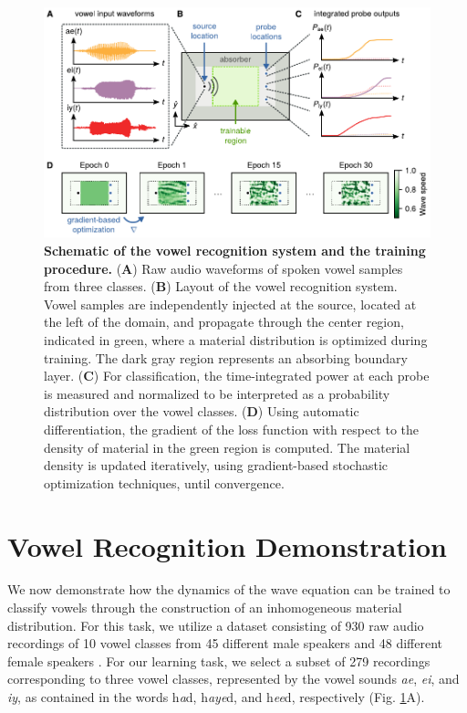 \begin{figure}
  \centering
  \includegraphics{figures/insitu_RNN_train}
  \caption{
  \textbf{Schematic of the vowel recognition system and the training procedure.}
  (\textbf{A})
  Raw audio waveforms of spoken vowel samples from three classes.
  (\textbf{B})
  Layout of the vowel recognition system. Vowel samples are independently injected at the source, located at the left of the domain, and propagate through the center region, indicated in green, where a material distribution is optimized during training. The dark gray region represents an absorbing boundary layer.
  (\textbf{C})
  For classification, the time-integrated power at each probe is measured and normalized to be interpreted as a probability distribution over the vowel classes.
  (\textbf{D})
  Using automatic differentiation, the gradient of the loss function with respect to the density of material in the green region is computed. The material density is updated iteratively, using gradient-based stochastic optimization techniques, until convergence.
  }
  \label{fig:train}
\end{figure}

\section{Vowel Recognition Demonstration}

We now demonstrate how the dynamics of the wave equation can be trained to classify vowels through the construction of an inhomogeneous material distribution. 
For this task, we utilize a dataset consisting of 930 raw audio recordings of 10 vowel classes from 45 different male speakers and 48 different female speakers \cite{hillenbrand_acoustic_1995}. 
For our learning task, we select a subset of 279 recordings corresponding to three vowel classes, represented by the vowel sounds \textit{ae}, \textit{ei}, and \textit{iy}, as contained in the words h\textit{a}d, h\textit{aye}d, and h\textit{ee}d, respectively (Fig. \ref{fig:train}A).

